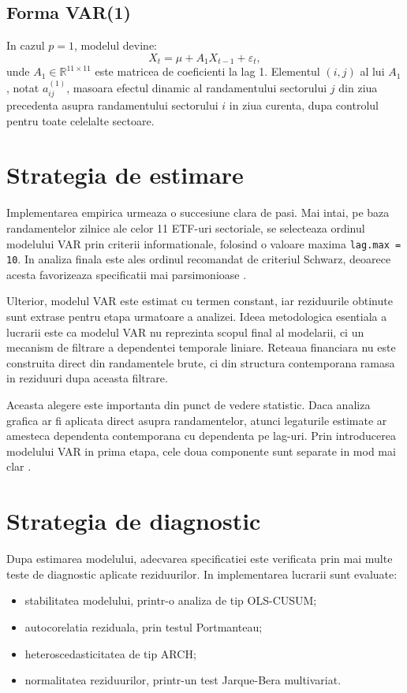 \subsection{Forma VAR(1)}

In cazul $p = 1$, modelul devine:
\begin{equation}
    X_t = \mu + A_1 X_{t-1} + \varepsilon_t,
    \label{eq:var1}
\end{equation}
unde $A_1 \in \mathbb{R}^{11 \times 11}$ este matricea de coeficienti la lag 1.
Elementul $(i,j)$ al lui $A_1$, notat $a_{ij}^{(1)}$, masoara efectul dinamic
al randamentului sectorului $j$ din ziua precedenta asupra randamentului
sectorului $i$ in ziua curenta, dupa controlul pentru toate celelalte sectoare.

\section{Strategia de estimare}

Implementarea empirica urmeaza o succesiune clara de pasi. Mai intai, pe baza
randamentelor zilnice ale celor 11 ETF-uri sectoriale, se selecteaza ordinul
modelului VAR prin criterii informationale, folosind o valoare maxima
\texttt{lag.max = 10}. In analiza finala este ales ordinul recomandat de
criteriul Schwarz, deoarece acesta favorizeaza specificatii mai parsimonioase
\citep{lutkepohl2005}.

Ulterior, modelul VAR este estimat cu termen constant, iar reziduurile obtinute
sunt extrase pentru etapa urmatoare a analizei. Ideea metodologica esentiala a
lucrarii este ca modelul VAR nu reprezinta scopul final al modelarii, ci un
mecanism de filtrare a dependentei temporale liniare. Reteaua financiara nu este
construita direct din randamentele brute, ci din structura contemporana ramasa
in reziduuri dupa aceasta filtrare.

Aceasta alegere este importanta din punct de vedere statistic. Daca analiza
grafica ar fi aplicata direct asupra randamentelor, atunci legaturile estimate
ar amesteca dependenta contemporana cu dependenta pe lag-uri. Prin introducerea
modelului VAR in prima etapa, cele doua componente sunt separate in mod mai clar
\citep{lutkepohl2005}.

\section{Strategia de diagnostic}

Dupa estimarea modelului, adecvarea specificatiei este verificata prin mai multe
teste de diagnostic aplicate reziduurilor. In implementarea lucrarii sunt
evaluate:
\begin{itemize}
    \item stabilitatea modelului, printr-o analiza de tip OLS-CUSUM;
    \item autocorelatia reziduala, prin testul Portmanteau;
    \item heteroscedasticitatea de tip ARCH;
    \item normalitatea reziduurilor, printr-un test Jarque-Bera multivariat.
\end{itemize}

